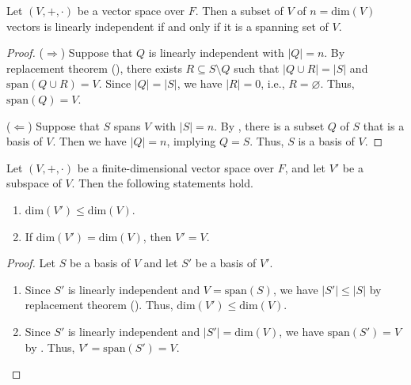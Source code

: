 \begin{theorem}\label{thm:basis-equivalence}
  Let $(V, +, \cdot)$ be a vector space over $F$.
  Then a subset of $V$ of $n = \mathrm{dim}(V)$ vectors is linearly
  independent if and only if it is a spanning set of $V$.
\end{theorem}
\begin{proof}
  ($\Rightarrow$) Suppose that $Q$ is linearly independent with $|Q| = n$.
  By replacement theorem (), there exists
  $R \subseteq S \setminus Q$ such that $|Q \cup R| = |S|$ and
  $\mathrm{span}(Q \cup R) = V$.
  Since $|Q| = |S|$, we have $|R| = 0$, i.e., $R = \varnothing$.
  Thus, $\mathrm{span}(Q) = V$.

  ($\Leftarrow$) Suppose that $S$ spans $V$ with $|S| = n$.
  By , there is a subset $Q$ of $S$
  that is a basis of $V$.
  Then we have $|Q| = n$, implying $Q = S$.
  Thus, $S$ is a basis of $V$.
\end{proof}

\begin{theorem}\label{thm:subspace-dimension}
  Let $(V, +, \cdot)$ be a finite-dimensional vector space over $F$,
  and let $V'$ be a subspace of $V$. Then the following statements hold.
  \begin{enumerate}
    \item $\mathrm{dim}(V') \leq \mathrm{dim}(V)$.
    \item If $\mathrm{dim}(V') = \mathrm{dim}(V)$, then $V' = V$.
  \end{enumerate}
\end{theorem}
\begin{proof}
  Let $S$ be a basis of $V$ and let $S'$ be a basis of $V'$.
  \begin{enumerate}
    \item Since $S'$ is linearly independent and $V = \mathrm{span}(S)$,
      we have $|S'| \leq |S|$ by replacement theorem ().
      Thus, $\mathrm{dim}(V') \leq \mathrm{dim}(V)$.
    \item Since $S'$ is linearly independent and $|S'| = \mathrm{dim}(V)$,
      we have $\mathrm{span}(S') = V$ by .
      Thus, $V' = \mathrm{span}(S') = V$. \qedhere
  \end{enumerate}
\end{proof}